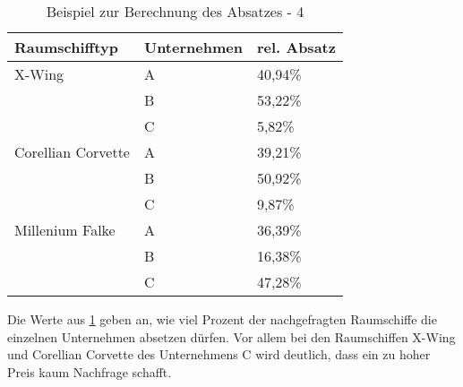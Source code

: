 \begin{table}[ht]
     \centering
     \begin{tabular}{ | l | l | l | }
          \hline
          Raumschifftyp & Unternehmen & rel. Absatz \\
          \hline \hline
          X-Wing & A & 40,94\%  \\
                 & B & 53,22\% \\
                 & C & 5,82\% \\ \hline
          Corellian Corvette & A & 39,21\% \\
                             & B & 50,92\% \\
                             & C & 9,87\% \\ \hline
          Millenium Falke & A & 36,39\% \\
                          & B & 16,38\% \\
                          & C & 47,28\% \\ \hline
     \end{tabular}
     \caption{Beispiel zur Berechnung des Absatzes - 4}
     \label{tab:spielwelt-logik-absatzmengen-beispiel4}
\end{table}

Die Werte aus \ref{tab:spielwelt-logik-absatzmengen-beispiel4} geben an, wie viel Prozent der nachgefragten Raumschiffe die einzelnen
Unternehmen absetzen dürfen. Vor allem bei den Raumschiffen X-Wing und Corellian Corvette des Unternehmens C wird deutlich, dass
ein zu hoher Preis kaum Nachfrage schafft.